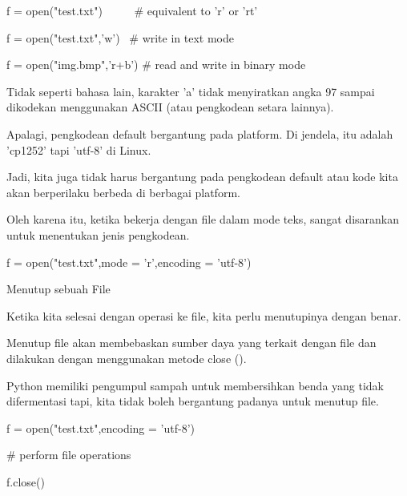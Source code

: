 \documentclass[a4paper,12pt]{report}
\begin{document}
\vspace{12pt}
\noindent 
f = open("test.txt")~~~~~  $  \#  $ equivalent to 'r' or 'rt' \par
\noindent 
f = open("test.txt",'w')~  $  \#  $ write in text mode \par
\noindent 
f = open("img.bmp",'r+b')  $  \#  $ read and write in binary mode \par
\vspace{12pt}
\noindent 
Tidak seperti bahasa lain, karakter 'a' tidak menyiratkan angka 97 sampai dikodekan menggunakan ASCII (atau pengkodean setara lainnya). \par
\vspace{12pt}
\noindent 
Apalagi, pengkodean default bergantung pada platform. Di jendela, itu adalah 'cp1252' tapi 'utf-8' di Linux. \par
\vspace{12pt}
\noindent 
Jadi, kita juga tidak harus bergantung pada pengkodean default atau kode kita akan berperilaku berbeda di berbagai platform. \par
\vspace{12pt}
\noindent 
Oleh karena itu, ketika bekerja dengan file dalam mode teks, sangat disarankan untuk menentukan jenis pengkodean. \par
\vspace{12pt}
\noindent 
f = open("test.txt",mode = 'r',encoding = 'utf-8') \par
\vspace{12pt}
\noindent 
Menutup sebuah File \par
\vspace{12pt}
\noindent 
Ketika kita selesai dengan operasi ke file, kita perlu menutupinya dengan benar. \par
\vspace{12pt}
\noindent 
Menutup file akan membebaskan sumber daya yang terkait dengan file dan dilakukan dengan menggunakan metode close (). \par
\vspace{12pt}
\noindent 
Python memiliki pengumpul sampah untuk membersihkan benda yang tidak difermentasi tapi, kita tidak boleh bergantung padanya untuk menutup file. \par
\noindent 
f = open("test.txt",encoding = 'utf-8') \par
\noindent 
 $  \#  $ perform file operations \par
\noindent 
f.close() \par
\vspace{16pt}
\noindent 
\end{document}
